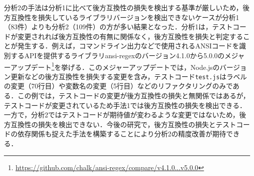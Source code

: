 \documentclass[submit]{ipsj}
\newcommand{\todo}[1]{\colorbox{yellow}{{\bf TODO}:}{\color{red} {\textbf{[#1]}}}}
\begin{document}
{分析2の手法は分析1に比べて後方互換性の損失を検出する基準が厳しいため，後方互換性を損失しているライブラリバージョンを検出できないケースが分析1（83件）よりも分析2（109件）の方が多い結果となった．分析1は，テストコードが変更されれば後方互換性の有無に関係なく，後方互換性を損失と判定することが発生する．例えば，コマンドライン出力などで使用されるANSIコードを識別するAPIを提供するライブラリansi-regexのバージョン4.1.0から5.0.0のメジャーアップデート\footnote{\url{https://github.com/chalk/ansi-regex/compare/v4.1.0...v5.0.0}}を挙げる．このメジャーアップデートでは，Node.jsのバージョン更新などの後方互換性を損失する変更を含み，テストコード\verb|test.js|はラベルの変更（70行目）や変数名の変更（5行目）などのリファクタリングのみである．この例では，テストコードの変更が後方互換性の損失と無関係ではあるが，テストコードが変更されているため手法1では後方互換性の損失を検出できる．一方で，分析2ではテストコードが期待値が変わるような変更ではないため，後方互換性の損失を検出できない．今後の研究で，後方互換性の損失とテストコードの依存関係も捉えた手法を構築することにより分析2の精度改善が期待できる．





}
\end{document}
